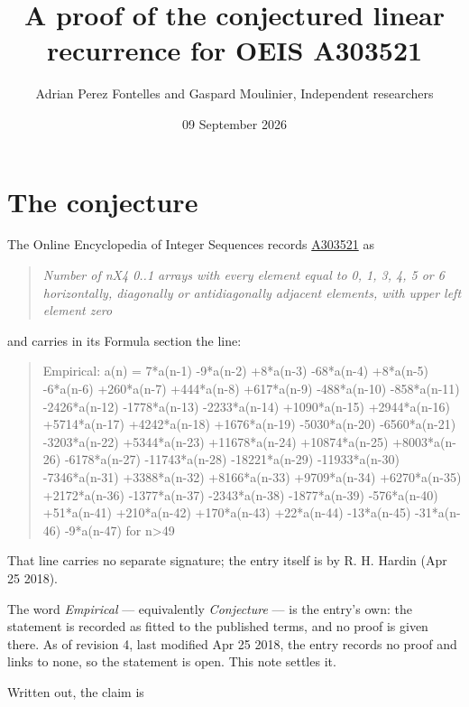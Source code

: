 \documentclass[11pt]{article}
\title{A proof of the conjectured linear recurrence for OEIS A303521}
\author{Adrian Perez Fontelles and Gaspard Moulinier, Independent researchers}
\date{09 September 2026}
\theoremstyle{definition}
\begin{document}
\maketitle
\section{The conjecture}

The Online Encyclopedia of Integer Sequences records \href{https://oeis.org/A303521}{A303521} as

\begin{quote}\itshape Number of nX4 0..1 arrays with every element equal to 0, 1, 3, 4, 5 or 6 horizontally, diagonally or antidiagonally adjacent elements, with upper left element zero\end{quote}

and carries in its Formula section the line:

\begin{quote}\ttfamily Empirical: a(n) = 7*a(n-1) -9*a(n-2) +8*a(n-3) -68*a(n-4) +8*a(n-5) -6*a(n-6) +260*a(n-7) +444*a(n-8) +617*a(n-9) -488*a(n-10) -858*a(n-11) -2426*a(n-12) -1778*a(n-13) -2233*a(n-14) +1090*a(n-15) +2944*a(n-16) +5714*a(n-17) +4242*a(n-18) +1676*a(n-19) -5030*a(n-20) -6560*a(n-21) -3203*a(n-22) +5344*a(n-23) +11678*a(n-24) +10874*a(n-25) +8003*a(n-26) -6178*a(n-27) -11743*a(n-28) -18221*a(n-29) -11933*a(n-30) -7346*a(n-31) +3388*a(n-32) +8166*a(n-33) +9709*a(n-34) +6270*a(n-35) +2172*a(n-36) -1377*a(n-37) -2343*a(n-38) -1877*a(n-39) -576*a(n-40) +51*a(n-41) +210*a(n-42) +170*a(n-43) +22*a(n-44) -13*a(n-45) -31*a(n-46) -9*a(n-47) for n>49\end{quote}

That line carries no separate signature; the entry itself is by R. H. Hardin (Apr 25 2018).

The word {\itshape Empirical} --- equivalently {\itshape Conjecture} --- is the entry's own: the statement is recorded as fitted to the published terms, and no proof is given there. As of revision 4, last modified Apr 25 2018, the entry records no proof and links to none, so the statement is open. This note settles it.

Written out, the claim is
\end{document}
